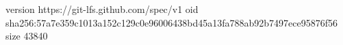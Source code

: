 version https://git-lfs.github.com/spec/v1
oid sha256:57a7e359c1013a152c129c0e96006438bd45a13fa788ab92b7497ece95876f56
size 43840
